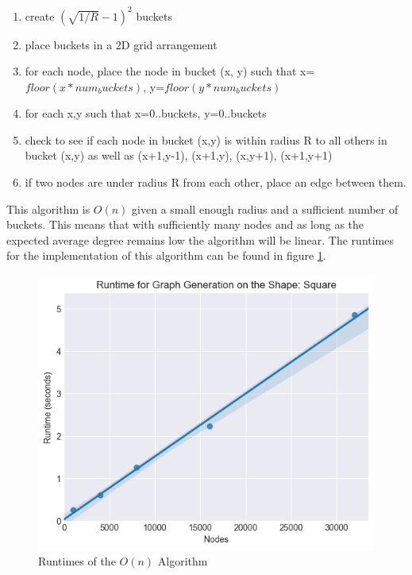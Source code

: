 \documentclass{article}
\begin{document}
    \begin{enumerate}
      \item create $(\sqrt{1/R} - 1 )^2$ buckets
      \item place buckets in a 2D grid arrangement
      \item for each node, place the node in bucket (x, y) such that x=$floor(x*num_buckets)$, y=$floor(y*num_buckets)$
      \item for each x,y such that x=0..buckets, y=0..buckets
      \item check to see if each node in bucket (x,y) is within radius R to all others in bucket (x,y) as well as (x+1,y-1), (x+1,y), (x,y+1), (x+1,y+1)
      \item if two nodes are under radius R from each other, place an edge between them.
    \end{enumerate}
    This algorithm is $O(n)$ given a small enough radius and a sufficient number of buckets.
    This means that with sufficiently many nodes and as long as the expected average degree remains low the algorithm will be linear.
    The runtimes for the implementation of this algorithm can be found in figure \ref{optimised_runtimes_for_connection}.
    \begin{figure}
      \label{optimised_runtimes_for_connection}
  		\includegraphics[width=1 \textwidth]{square/runtime/runtime_chart}
  		\caption{Runtimes of the $O(n)$ Algorithm}
	  \end{figure}
\end{document}

